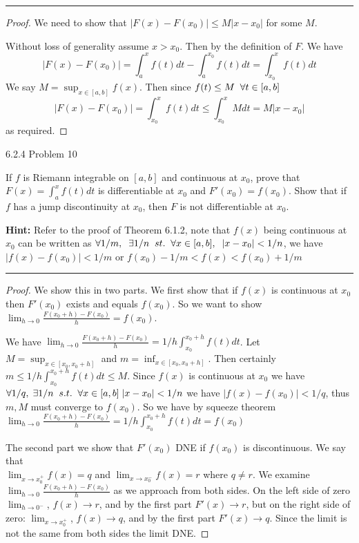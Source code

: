 \documentclass[11pt]{article}
\begin{document}
\hrule


\begin{proof}
    We need to show that $|F(x) - F(x_0)| \leq M |x - x_0|$ for some $M$.

    Without loss of generality assume $x > x_0$. Then by the definition of $F$. 
    We have $$|F(x) - F(x_0)| = \int_a ^x f(t) dt - \int_a ^{x_0} f(t) dt = \int_{x_0} ^x f(t) dt$$ 
    We say $M = \sup_{x \in [a,b]} f(x)$. 
    Then since $f(t) \leq M \sp \forall t \in [a,b]$
     $$|F(x) - F(x_0)| = \int_{x_0} ^x f(t) dt \leq \int_{x_0} ^x M dt = M |x - x_0|$$ as required.
\end{proof}

 6.2.4 Problem 10

If $f$ is Riemann integrable on $[a, b]$ and continuous at $x_0$, prove
that $F(x) = \int_a ^x f(t) dt$ is differentiable at $x_0$ and $F'(x_0) = f(x_0)$.
Show that if $f$ has a jump discontinuity at $x_0$, then $F$ is not
differentiable at $x_0$. 

\textbf{Hint: } Refer to the proof of Theorem 6.1.2, note that $f(x)$ being continuous at $x_0$
can be written as $\forall 1/m, \sp \exists 1/n \sp st. \sp \forall x \in [a,b], \sp |x - x_0| < 1/n$, we have $|f(x) - f(x_0)| < 1/m$
or $f(x_0) - 1/m < f(x) < f(x_0) + 1/m$
\hrule


\begin{proof}
    
    We show this in two parts. We first show that if $f(x)$ is continuous at $x_0$ then $F'(x_0)$ exists and equals $f(x_0)$.
    So we want to show $\lim_{h \to 0} \frac{F(x_0 + h) - F(x_0)}{h} = f(x_0)$.

    We have $\lim_{h \to 0} \frac{F(x_0 + h) - F(x_0)}{h} = 1/h \int_{x_0} ^{x_0 + h} f(t)dt$. Let $M = \sup_{x \in [x_0, x_0 + h]}$ and $m = \inf_{x \in [x_0, x_0 + h]}$.
    Then certainly $m \leq 1/h \int_{x_0} ^{x_0 + h} f(t)dt \leq M$. 
    Since $f(x)$ is continuous at $x_0$ we have \\
    $\forall 1/q, \; \exists 1/n \sp s.t. \sp \forall x \in [a,b] \; |x - x_0| < 1/n$ we have $|f(x) - f(x_0)| < 1/q$, thus $m, M$ must converge to $f(x_0)$.
    So we have by squeeze theorem \\
    $\lim_{h \to 0} \frac{F(x_0 + h) - F(x_0)}{h} = 1/h \int_{x_0} ^{x_0 + h} f(t)dt = f(x_0)$

    The second part we show that $F'(x_0)$ DNE if $f(x_0)$ is discontinuous. We say that \\$\lim_{x \to x_0^+} f(x) = q$
    and $\lim_{x \to x_0^-} f(x)= r$ where $q \neq r$. We examine $\lim_{h \to 0} \frac{F(x_0 + h) - F(x_0)}{h}$ as we approach from both sides.
    On the left side of zero $\lim_{h \to 0^-}$, $f(x) \to r$, and by the first part $F'(x) \to r$, but on the right side
    of zero: $\lim_{x \to x_0^+}$, $f(x) \to q$, and by the first part $F'(x) \to q$. Since the limit is not the same from both sides
    the limit DNE.
\end{proof}
\end{document}
